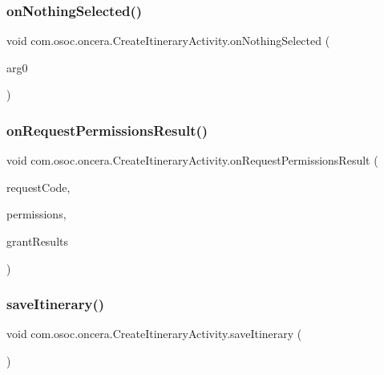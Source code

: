 \subsubsection{\texorpdfstring{onNothingSelected()}{onNothingSelected()}}
{\footnotesize\ttfamily void com.\+osoc.\+oncera.\+Create\+Itinerary\+Activity.\+on\+Nothing\+Selected (\begin{DoxyParamCaption}\item[{Adapter\+View$<$?$>$}]{arg0 }\end{DoxyParamCaption})}

\mbox{\label{classcom_1_1osoc_1_1oncera_1_1_create_itinerary_activity_a4bbc27a848ff24ef1759544b5a91dc28}} 
\subsubsection{\texorpdfstring{onRequestPermissionsResult()}{onRequestPermissionsResult()}}
{\footnotesize\ttfamily void com.\+osoc.\+oncera.\+Create\+Itinerary\+Activity.\+on\+Request\+Permissions\+Result (\begin{DoxyParamCaption}\item[{int}]{request\+Code,  }\item[{@Non\+Null String \mbox{[}$\,$\mbox{]}}]{permissions,  }\item[{@Non\+Null int \mbox{[}$\,$\mbox{]}}]{grant\+Results }\end{DoxyParamCaption})}

\mbox{\label{classcom_1_1osoc_1_1oncera_1_1_create_itinerary_activity_addc7b773e16619587ff9dbbc0097740c}} 
\subsubsection{\texorpdfstring{saveItinerary()}{saveItinerary()}}
{\footnotesize\ttfamily void com.\+osoc.\+oncera.\+Create\+Itinerary\+Activity.\+save\+Itinerary (\begin{DoxyParamCaption}{ }\end{DoxyParamCaption})}

